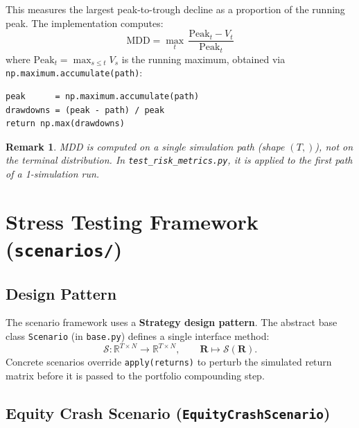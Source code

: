 \documentclass[12pt, a4paper]{article}
\newtheorem{remark}{Remark}[section]
\begin{document}
This measures the largest peak-to-trough decline as a proportion of the running
peak. The implementation computes:
\begin{equation}
    \boxed{\mathrm{MDD} = \max_{t}\,\frac{\mathrm{Peak}_t - V_t}{\mathrm{Peak}_t}}
    \label{eq:mdd}
\end{equation}
where $\mathrm{Peak}_t = \max_{s \leq t} V_s$ is the running maximum, obtained
via \texttt{np.maximum.accumulate(path)}:
\begin{lstlisting}
peak      = np.maximum.accumulate(path)
drawdowns = (peak - path) / peak
return np.max(drawdowns)
\end{lstlisting}

\begin{remark}
    MDD is computed on a \emph{single} simulation path (shape $(T,)$), not on
    the terminal distribution. In \texttt{test\_risk\_metrics.py}, it is applied
    to the first path of a 1-simulation run.
\end{remark}

\section{Stress Testing Framework (\texttt{scenarios/})}
\label{sec:scenarios}

\subsection{Design Pattern}

The scenario framework uses a \textbf{Strategy design pattern}. The abstract
base class \texttt{Scenario} (in \texttt{base.py}) defines a single interface
method:
\[
    \mathcal{S}: \mathbb{R}^{T \times N} \to \mathbb{R}^{T \times N},
    \qquad \mathbf{R} \mapsto \mathcal{S}(\mathbf{R}).
\]
Concrete scenarios override \texttt{apply(returns)} to perturb the simulated
return matrix before it is passed to the portfolio compounding step.

\subsection{Equity Crash Scenario (\texttt{EquityCrashScenario})}
\end{document}
